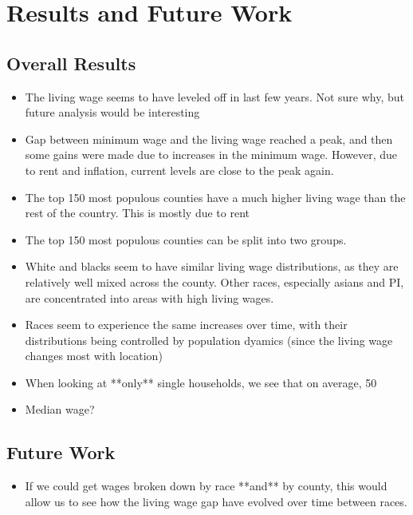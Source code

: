 \chapter{Results and Future Work}\label{ch:results}

\section{Overall Results}

\begin{itemize}
\item The living wage seems to have leveled off in last few years. Not sure why, but future analysis would be interesting
\item Gap between minimum wage and the living wage reached a peak, and then some gains were made due to increases in the minimum wage. However, due to rent and inflation, current levels are close to the peak again.
\item The top 150 most populous counties have a much higher living wage than the rest of the country. This is mostly due to rent
\item The top 150 most populous counties can be split into two groups. 
\item White and blacks seem to have similar living wage distributions, as they are relatively well mixed across the county. Other races, especially asians and PI, are concentrated into areas with high living wages.
\item Races seem to experience the same increases over time, with their distributions being controlled by population dyamics (since the living wage changes most with location)
\item When looking at **only** single households, we see that on average, 50%

\item Median wage?
\end{itemize}



\section{Future Work}

\begin{itemize}
\item If we could get wages broken down by race **and** by county, this would allow us to see how the living wage gap have evolved over time between races. 
\end{itemize}